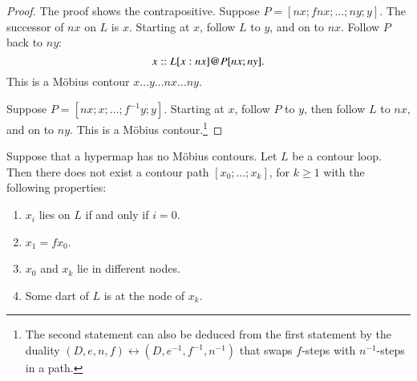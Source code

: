 \begin{proof} The proof shows the contrapositive.  Suppose $P=[n x;f n
x;\ldots;n y;y]$.  The successor of $n x$ on $L$ is $x$.  Starting
at $x$, follow $L$ to $y$, and on to $n x$.  Follow $P$ back to $n
y$:
\begin{displaymath}
x::L[x:n x] {{\operatorname{@}}} P[ n x;ny].
\end{displaymath}  
This is a M\"obius contour $x\ldots y\ldots n x\ldots n y$.

Suppose $P=[n x;x;\ldots;f^{-1} y;y]$.  Starting at $x$, follow $P$ to
$y$, then follow $L$ to $n x$, and on to $n y$.  This is a M\"obius
contour.\footnote{The second statement can also be deduced from the first statement
by the duality $(D,e,n,f)\leftrightarrow (D,e^{-1},f^{-1},n^{-1})$ that swaps
$f$-steps with $n^{-1}$-steps in a path.}
\end{proof}


%


\begin{lemma}
Suppose that a hypermap has no M\"obius contours.  Let $L$ be a
contour loop.  Then there does not exist a contour path
$[x_0;\ldots;x_k]$, for $k\ge 1$ with the following properties:
\begin{enumerate}
\item $x_i$ lies on $L$ if and only if $i=0$.
\item $x_1 = f x_0$.
\item $x_0$ and $x_k$ lie in different nodes.
\item Some dart of $L$ is at the node of $x_k$.
\end{enumerate}
\end{lemma}

